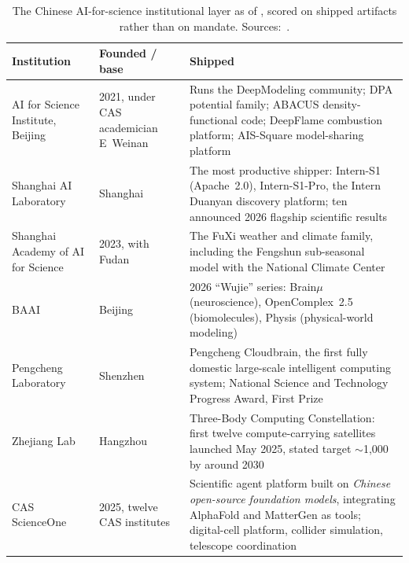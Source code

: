 \begin{table}[htbp]
\centering\footnotesize
\caption{The Chinese AI-for-science institutional layer as of \datafreeze, scored on shipped artifacts rather than on mandate. Sources:~\cite{ai4s-institutions,cas-scienceone,intern-s1-2025,deepmodeling,pengcheng-cloudbrain,fuxi-weather}.}
\label{tab:china-ai4s}
\setlength{\tabcolsep}{4pt}
\begin{tabular}{@{}p{31mm}p{26mm}p{75mm}@{}}
\toprule
\textbf{Institution} & \textbf{Founded / base} & \textbf{Shipped} \\
\midrule
AI for Science Institute, Beijing & 2021, under CAS academician E~Weinan & Runs the DeepModeling community; DPA potential family; ABACUS density-functional code; DeepFlame combustion platform; AIS-Square model-sharing platform \\
\addlinespace
Shanghai AI Laboratory & Shanghai & The most productive shipper: Intern-S1 (Apache~2.0), Intern-S1-Pro, the Intern Duanyan discovery platform; ten announced 2026 flagship scientific results \\
\addlinespace
Shanghai Academy of AI for Science & 2023, with Fudan & The FuXi weather and climate family, including the Fengshun sub-seasonal model with the National Climate Center \\
\addlinespace
BAAI & Beijing & 2026 ``Wujie'' series: Brain$\mu$ (neuroscience), OpenComplex~2.5 (biomolecules), Physis (physical-world modeling) \\
\addlinespace
Pengcheng Laboratory & Shenzhen & Pengcheng Cloudbrain, the first fully domestic large-scale intelligent computing system; National Science and Technology Progress Award, First Prize \\
\addlinespace
Zhejiang Lab & Hangzhou & Three-Body Computing Constellation: first twelve compute-carrying satellites launched May 2025, stated target $\sim$1{,}000 by around 2030 \\
\addlinespace
CAS ScienceOne & 2025, twelve CAS institutes & Scientific agent platform built on \emph{Chinese open-source foundation models}, integrating AlphaFold and MatterGen as tools; digital-cell platform, collider simulation, telescope coordination \\
\bottomrule
\end{tabular}
\end{table}

